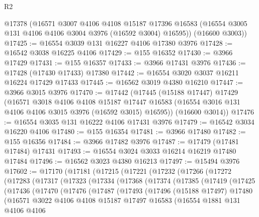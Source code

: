 \begin{lexlean}{R2}
\begin{coremodule}
      @17378
      (@16571
        @3007
        @4106
        @4108
        @15187
        @17396
        @16583
        (@16554 @3005 @131 @4106 @4106 @3004 @3976 (@16592 @3004) @16595))
      (@16600 @3003))
@17425 := @16554 @3039 @131 @16227 @4106 @17380 @3976
@17428 := @16542 @3038 @16225 @4106
@17429 := @155 @16352
@17430 := @3966 @17429
@17431 := @155 @16357
@17433 := @3966 @17431 @3976
@17436 := @17428 (@17430 @17433) @17380
@17442 := @16554 @3020 @3037 @16211 @16224 @17429 @17433
@17445 := @16562 @3019 @4380 @16210
@17447 := @3966 @3015 @3976
@17470 := @17442
    (@17445
      (@15188 @17447)
      @17429
      (@16571
        @3018
        @4106
        @4108
        @15187
        @17447
        @16583
        (@16554 @3016 @131 @4106 @4106 @3015 @3976 (@16592 @3015) @16595))
      (@16600 @3014))
@17476 := @16554 @3035 @131 @16222 @4106 @17431 @3976
@17479 := @16542 @3034 @16220 @4106
@17480 := @155 @16354
@17481 := @3966 @17480
@17482 := @155 @16356
@17484 := @3966 @17482 @3976
@17487 := @17479 (@17481 @17484) @17431
@17493 := @16554 @3024 @3033 @16214 @16219 @17480 @17484
@17496 := @16562 @3023 @4380 @16213
@17497 := @15494 @3976
@17602 := @17170
    (@17181
      (@17215
        (@17221
          (@17232
            (@17266
              (@17272
                (@17283
                  (@17317
                    (@17323
                      (@17334
                        (@17368
                          (@17374
                            (@17385
                              (@17419
                                (@17425
                                  (@17436
                                    (@17470
                                      (@17476
                                        (@17487
                                          (@17493
                                            (@17496
                                              (@15188 @17497)
                                              @17480
                                              (@16571
                                                @3022
                                                @4106
                                                @4108
                                                @15187
                                                @17497
                                                @16583
                                                (@16554
                                                  @1881
                                                  @131
                                                  @4106
                                                  @4106

\end{coremodule}
\end{lexlean}
